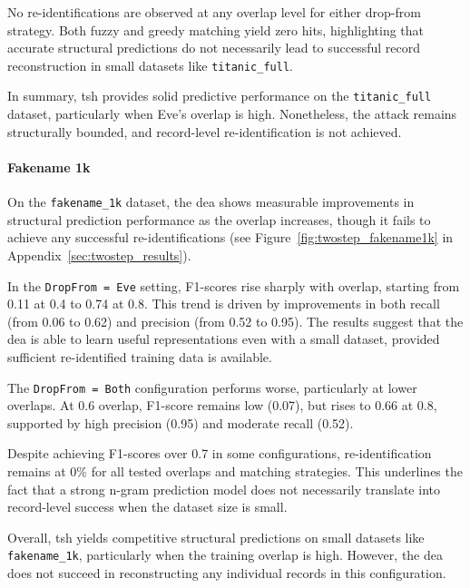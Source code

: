 No re-identifications are observed at any overlap level for either drop-from strategy.
Both fuzzy and greedy matching yield zero hits, highlighting that accurate structural predictions do not necessarily lead to successful record reconstruction in small datasets like \texttt{titanic\_full}.



In summary, \ac{tsh} provides solid predictive performance on the \texttt{titanic\_full} dataset, particularly when Eve's overlap is high.
Nonetheless, the attack remains structurally bounded, and record-level re-identification is not achieved.


\paragraph{Fakename 1k}

On the \texttt{fakename\_1k} dataset, the \ac{dea} shows measurable improvements in structural prediction performance as the overlap increases, though it fails to achieve any successful re-identifications (see Figure~\ref{fig:twostep_fakename1k} in Appendix~\ref{sec:twostep_results}).

In the \texttt{DropFrom = Eve} setting, F1-scores rise sharply with overlap, starting from 0.11 at 0.4 to 0.74 at 0.8.
This trend is driven by improvements in both recall (from 0.06 to 0.62) and precision (from 0.52 to 0.95).
The results suggest that the \ac{dea} is able to learn useful representations even with a small dataset, provided sufficient re-identified training data is available.

The \texttt{DropFrom = Both} configuration performs worse, particularly at lower overlaps.
At 0.6 overlap, F1-score remains low (0.07), but rises to 0.66 at 0.8, supported by high precision (0.95) and moderate recall (0.52).

Despite achieving F1-scores over 0.7 in some configurations, re-identification remains at 0\% for all tested overlaps and matching strategies.
This underlines the fact that a strong n-gram prediction model does not necessarily translate into record-level success when the dataset size is small.



Overall, \ac{tsh} yields competitive structural predictions on small datasets like \texttt{fakename\_1k}, particularly when the training overlap is high.
However, the \ac{dea} does not succeed in reconstructing any individual records in this configuration.



